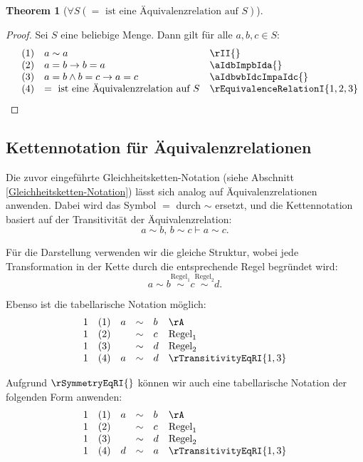 \documentclass{book}
\theoremstyle{plain}
\newtheorem{theorem}{Theorem}
\theoremstyle{remark}
\theoremstyle{definition}
\begin{document}
\label{FaSLpEqualsInEquivalencerelationSRp}
\begin{theorem}[\(\forall S(= \text{ ist eine Äquivalenzrelation auf } S)\)]
\end{theorem}
\begin{proof}
    Sei \(S\) eine beliebige Menge. Dann gilt für alle \(a,b,c\in S\):
	\[
	\begin{array}{llll}
		    & (1) & a \sim a & \rII{}\\
                & (2) & a=b\rightarrow b=a & \aIdbImpbIda{}\\
		    & (3) & a=b\land b=c\rightarrow a=c & \aIdbwbIdcImpaIdc{}\\
                & (4) & = \text{ ist eine Äquivalenzrelation auf } S & \rEquivalenceRelationI{1,2,3}\\
	\end{array}
	\]
\end{proof}


\subsection{Kettennotation für Äquivalenzrelationen}

Die zuvor eingeführte Gleichheitsketten-Notation (siehe Abschnitt \ref{Gleichheitsketten-Notation}) lässt sich analog auf Äquivalenzrelationen anwenden. Dabei wird das Symbol \(=\) durch \(\sim\) ersetzt, und die Kettennotation basiert auf der Transitivität der Äquivalenzrelation:
\[
a \sim b, \, b \sim c \vdash a \sim c.
\]

Für die Darstellung verwenden wir die gleiche Struktur, wobei jede Transformation in der Kette durch die entsprechende Regel begründet wird:
\[
a \sim b \stackrel{\text{Regel}_1}{\sim} c \stackrel{\text{Regel}_2}{\sim} d.
\]

Ebenso ist die tabellarische Notation möglich:
\[
\begin{array}{llclll}
	1 & (1) & a & \sim & b & \rA \\
	1 & (2) &   & \sim & c & \text{Regel}_1 \\
	1 & (3) &   & \sim & d & \text{Regel}_2 \\
        1 & (4) & a & \sim & d & \rTransitivityEqRI{1,3} \\
\end{array}
\]

Aufgrund \(\rSymmetryEqRI{}\) können wir auch eine tabellarische Notation der folgenden Form anwenden:
\[
\begin{array}{llclll}
	1 & (1) & a & \sim & b & \rA \\
	1 & (2) &   & \sim & c & \text{Regel}_1 \\
	1 & (3) &   & \sim & d & \text{Regel}_2 \\
        1 & (4) & d & \sim & a & \rTransitivityEqRI{1,3} \\
\end{array}
\]
\end{document}

